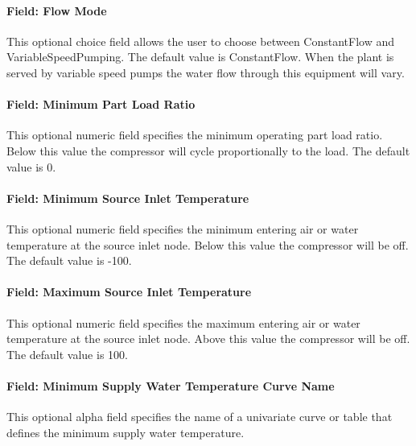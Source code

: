 \paragraph{Field: Flow Mode}\label{plhp_eir_cooling_inputs_flow_mode}

This optional choice field allows the user to choose between ConstantFlow and VariableSpeedPumping. The default value is ConstantFlow. When the plant is served by variable speed pumps the water flow through this equipment will vary.

\paragraph{Field: Minimum Part Load Ratio}\label{plhp_eir_cooling_inputs_minimum_part_load_ratio}

This optional numeric field specifies the minimum operating part load ratio. Below this value the compressor will cycle proportionally to the load. The default value is 0.

\paragraph{Field: Minimum Source Inlet Temperature}\label{plhp_eir_cooling_inputs_minimum_source_inlet_temperature}

This optional numeric field specifies the minimum entering air or water temperature at the source inlet node. Below this value the compressor will be off. The default value is -100.

\paragraph{Field: Maximum Source Inlet Temperature}\label{plhp_eir_cooling_inputs_maximum_source_inlet_temperature}

This optional numeric field specifies the maximum entering air or water temperature at the source inlet node. Above this value the compressor will be off. The default value is 100.

\paragraph{Field: Minimum Supply Water Temperature Curve Name}\label{plhp_eir_cooling_inputs_minimum_supply_water_temperature_curve_name}

This optional alpha field specifies the name of a univariate curve or table that defines the minimum supply water temperature.

